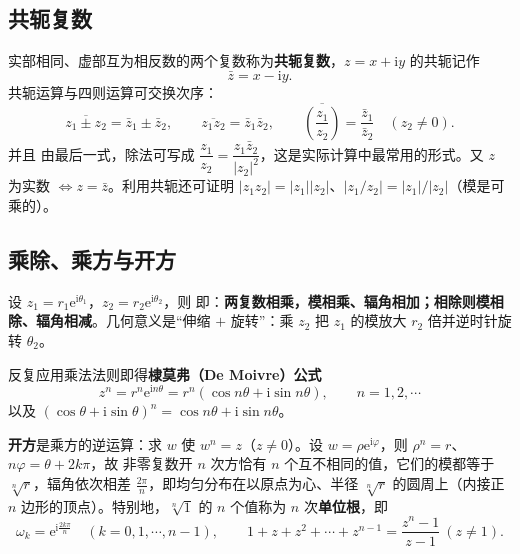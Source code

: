 \subsection{共轭复数}
实部相同、虚部互为相反数的两个复数称为\textbf{共轭复数}，\(z=x+\mathrm{i}y\) 的共轭记作
\[
\bar z=x-\mathrm{i}y .
\]
共轭运算与四则运算可交换次序：
\[
\overline{z_{1}\pm z_{2}}=\bar z_{1}\pm\bar z_{2},\qquad
\overline{z_{1}z_{2}}=\bar z_{1}\bar z_{2},\qquad
\overline{\left(\frac{z_{1}}{z_{2}}\right)}=\frac{\bar z_{1}}{\bar z_{2}}\quad(z_{2}\neq 0).
\]
并且
由最后一式，除法可写成 \(\dfrac{z_{1}}{z_{2}}=\dfrac{z_{1}\bar z_{2}}{|z_{2}|^{2}}\)，这是实际计算中最常用的形式。又 \(z\) 为实数 \(\iff z=\bar z\)。利用共轭还可证明 \(|z_{1}z_{2}|=|z_{1}||z_{2}|\)、\(|z_{1}/z_{2}|=|z_{1}|/|z_{2}|\)（模是可乘的）。

\subsection{乘除、乘方与开方}
设 \(z_{1}=r_{1}\mathrm{e}^{\mathrm{i}\theta_{1}}\)，\(z_{2}=r_{2}\mathrm{e}^{\mathrm{i}\theta_{2}}\)，则
即：\textbf{两复数相乘，模相乘、辐角相加；相除则模相除、辐角相减}。几何意义是“伸缩 \(+\) 旋转”：乘 \(z_{2}\) 把 \(z_{1}\) 的模放大 \(r_{2}\) 倍并逆时针旋转 \(\theta_{2}\)。

反复应用乘法法则即得\textbf{棣莫弗（De Moivre）公式}
\[
z^{n}=r^{n}\mathrm{e}^{\mathrm{i}n\theta}=r^{n}(\cos n\theta+\mathrm{i}\sin n\theta),\qquad n=1,2,\cdots
\]
以及 \((\cos\theta+\mathrm{i}\sin\theta)^{n}=\cos n\theta+\mathrm{i}\sin n\theta\)。

\textbf{开方}是乘方的逆运算：求 \(w\) 使 \(w^{n}=z\)（\(z\neq 0\)）。设 \(w=\rho\mathrm{e}^{\mathrm{i}\varphi}\)，则 \(\rho^{n}=r\)、\(n\varphi=\theta+2k\pi\)，故
非零复数开 \(n\) 次方恰有 \(n\) 个互不相同的值，它们的模都等于 \(\sqrt[n]{r}\)，辐角依次相差 \(\frac{2\pi}{n}\)，即均匀分布在以原点为心、半径 \(\sqrt[n]{r}\) 的圆周上（内接正 \(n\) 边形的顶点）。特别地，\(\sqrt[n]{1}\) 的 \(n\) 个值称为 \(n\) 次\textbf{单位根}，即
\[
\omega_{k}=\mathrm{e}^{\mathrm{i}\frac{2k\pi}{n}}\quad (k=0,1,\cdots,n-1),\qquad
1+z+z^{2}+\cdots+z^{n-1}=\frac{z^{n}-1}{z-1}\ (z\neq 1).
\]

